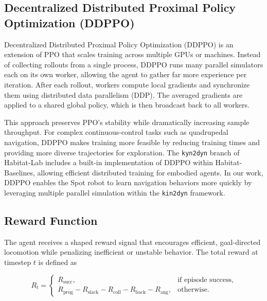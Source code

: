 \documentclass{article} %
\begin{document}
\subsection{Decentralized Distributed Proximal Policy Optimization (DDPPO)}
Decentralized Distributed Proximal Policy Optimization (DDPPO) \cite{wijmans2019dd} is an extension of PPO that scales training across multiple GPUs or machines. Instead of collecting rollouts from a single process, DDPPO runs many parallel simulators each on its own worker, allowing the agent to gather far more experience per iteration. After each rollout, workers compute local gradients and synchronize them using distributed data parallelism (DDP). The averaged gradients are applied to a shared global policy, which is then broadcast back to all workers.

This approach preserves PPO’s stability while dramatically increasing sample throughput. For complex continuous-control tasks such as quadrupedal navigation, DDPPO makes training more feasible by reducing training times and providing more diverse trajectories for exploration. The \texttt{kyn2dyn} branch of Habitat-Lab includes a built-in implementation of DDPPO within Habitat-Baselines, allowing efficient distributed training for embodied agents. In our work, DDPPO enables the Spot robot to learn navigation behaviors more quickly by leveraging multiple parallel simulation within the \texttt{kin2dyn} framework.

\subsection{Reward Function}

The agent receives a shaped reward signal that encourages efficient, goal-directed locomotion while penalizing inefficient or unstable behavior. 
The total reward at timestep $t$ is defined as

\begin{equation}
R_t =
\begin{cases}
R_{\text{succ}}, & \text{if episode success,} \\[4pt]
R_{\text{prog}} - R_{\text{slack}} - R_{\text{coll}} - R_{\text{back}} - R_{\text{ang}}, & \text{otherwise.}
\end{cases}
\end{equation}
\end{document}
